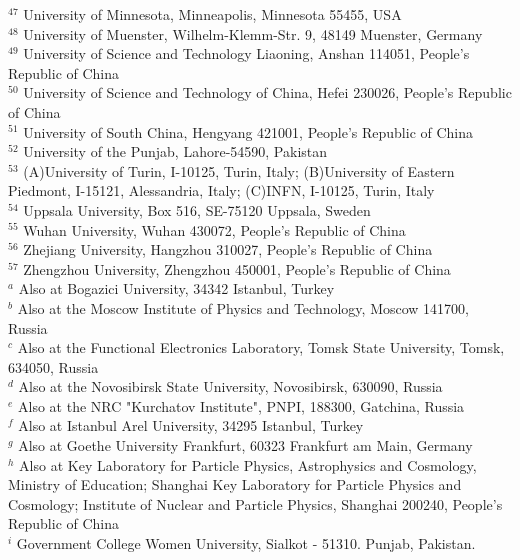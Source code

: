 \begin{small}
\begin{center}
{$^{47}$ University of Minnesota, Minneapolis, Minnesota 55455, USA\\
$^{48}$ University of Muenster, Wilhelm-Klemm-Str. 9, 48149 Muenster, Germany\\
$^{49}$ University of Science and Technology Liaoning, Anshan 114051, People's Republic of China\\
$^{50}$ University of Science and Technology of China, Hefei 230026, People's Republic of China\\
$^{51}$ University of South China, Hengyang 421001, People's Republic of China\\
$^{52}$ University of the Punjab, Lahore-54590, Pakistan\\
$^{53}$ (A)University of Turin, I-10125, Turin, Italy; (B)University of Eastern Piedmont, I-15121, Alessandria, Italy; (C)INFN, I-10125, Turin, Italy\\
$^{54}$ Uppsala University, Box 516, SE-75120 Uppsala, Sweden\\
$^{55}$ Wuhan University, Wuhan 430072, People's Republic of China\\
$^{56}$ Zhejiang University, Hangzhou 310027, People's Republic of China\\
$^{57}$ Zhengzhou University, Zhengzhou 450001, People's Republic of China\\
\vspace{0.2cm}
$^{a}$ Also at Bogazici University, 34342 Istanbul, Turkey\\
$^{b}$ Also at the Moscow Institute of Physics and Technology, Moscow 141700, Russia\\
$^{c}$ Also at the Functional Electronics Laboratory, Tomsk State University, Tomsk, 634050, Russia\\
$^{d}$ Also at the Novosibirsk State University, Novosibirsk, 630090, Russia\\
$^{e}$ Also at the NRC "Kurchatov Institute", PNPI, 188300, Gatchina, Russia\\
$^{f}$ Also at Istanbul Arel University, 34295 Istanbul, Turkey\\
$^{g}$ Also at Goethe University Frankfurt, 60323 Frankfurt am Main, Germany\\
$^{h}$ Also at Key Laboratory for Particle Physics, Astrophysics and Cosmology, Ministry of Education; Shanghai Key Laboratory for Particle Physics and Cosmology; Institute of Nuclear and Particle Physics, Shanghai 200240, People's Republic of China\\
$^{i}$ Government College Women University, Sialkot - 51310. Punjab, Pakistan. \\
}\end{center}

\vspace{0.4cm}
\end{small}